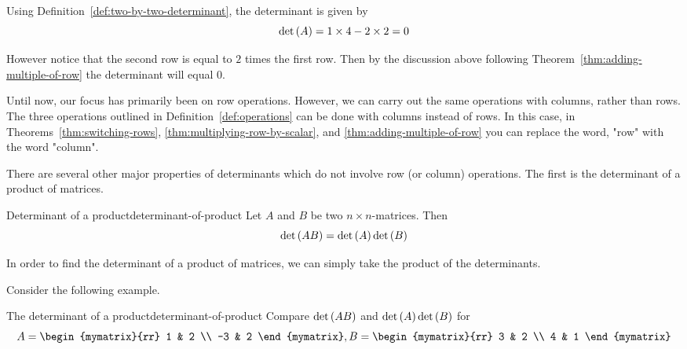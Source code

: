\begin{solution}
Using Definition~\ref{def:two-by-two-determinant}, the determinant is given by
\[
\det \left(A \right) = 1 \times 4 - 2 \times 2 = 0
\]

However notice that the second row is equal to $2$ times the first row. Then by the discussion above following Theorem~\ref{thm:adding-multiple-of-row} the determinant will equal $0$.
\end{solution}

Until now, our focus has primarily been on row operations. However, we can carry out the 
same operations with columns, rather than rows. The three operations outlined in
Definition~\ref{def:operations} can be done with columns instead of rows. 
In this case, in Theorems~\ref{thm:switching-rows}, {\ref{thm:multiplying-row-by-scalar}}, 
and {\ref{thm:adding-multiple-of-row}} you can replace
the word, "row" with the word "column".

There are several other major properties of determinants which do not involve
row (or column) operations. The first is the determinant of a product of matrices. 

\begin{theorem}{Determinant of a product}{determinant-of-product}
Let $A$ and $B$ be two $n\times n$-matrices. Then
\begin{equation*}
\det \left(AB\right) =\det \left(A\right) \det \left(B\right)
\end{equation*}
\end{theorem}

In order to find the determinant of a product of matrices, we can simply take the product of the determinants. 

Consider the following example.

\begin{example}{The determinant of a product}{determinant-of-product}
Compare $\det \left(AB\right) $ and $\det \left(A\right) \det \left(
B\right) $ for
\begin{equation*}
A=\begin{mymatrix}{rr}
1 & 2 \\
-3 & 2
\end{mymatrix} ,B=\begin{mymatrix}{rr}
3 & 2 \\
4 & 1
\end{mymatrix} 
\end{equation*}
\end{example}

